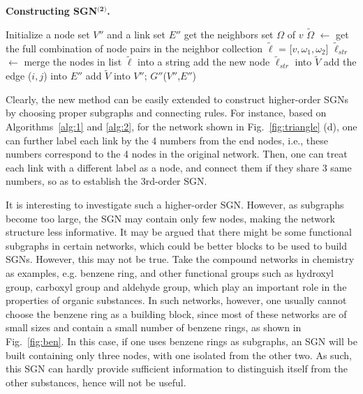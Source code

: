 \documentclass[10pt,journal,compsoc]{IEEEtran}
\begin{document}
\begin{algorithm}[!t]
\caption{\textbf{Constructing SGN$^{\textbf{(2)}}$.}}
\label{alg:2}
Initialize a node set $V''$ and a link set $E''$\;
{
    get the neighbors set $\Omega$ of $v$\;
    $\widetilde{\Omega}$ $\leftarrow$ get the full combination of node pairs in the neighbor collection\;
        {
        $\widetilde{\ell}$ = [$v,\omega_1,\omega_2$]\;
        $\widetilde{\ell}_{str}$ $\leftarrow$ merge the nodes in list $\widetilde{\ell}$ into a string\;
        add the new node $\widetilde{\ell}_{str}$ into $\widetilde{V}$\;}
        {add the edge ($i,j$) into $E''$ \;}
        add $\widetilde{V}$ into $V''$;
}
\Return $G''$($V''$,$E''$)\;
\end{algorithm}

Clearly, the new method can be easily extended to construct higher-order SGNs by choosing proper subgraphs and connecting rules. For instance, based on Algorithms~\ref{alg:1} and \ref{alg:2}, for the network shown in Fig.~\ref{fig:triangle} (d), one can further label each link by the 4 numbers from the end nodes, i.e., these numbers correspond to the 4 nodes in the original network. Then, one can treat each link with a different label as a node, and connect them if they share 3 same numbers, so as to establish the 3rd-order SGN.

It is interesting to investigate such a higher-order SGN. However, as subgraphs become too large, the SGN may contain only few nodes, making the network structure less informative. It may be argued that there might be some functional subgraphs in certain networks, which could be better blocks to be used to build SGNs. However, this may not be true. Take the compound networks in chemistry as examples, e.g. benzene ring, and other functional groups such as hydroxyl group, carboxyl group and aldehyde group, which play an important role in the properties of organic substances. In such networks, however, one usually cannot choose the benzene ring as a building block, since most of these networks are of small sizes and contain a small number of benzene rings, as shown in Fig.~\ref{fig:ben}. In this case, if one uses benzene rings as subgraphs, an SGN will be built containing only three nodes, with one isolated from the other two. As such, this SGN can hardly provide sufficient information to distinguish itself from the other substances, hence will not be useful.
\end{document}
